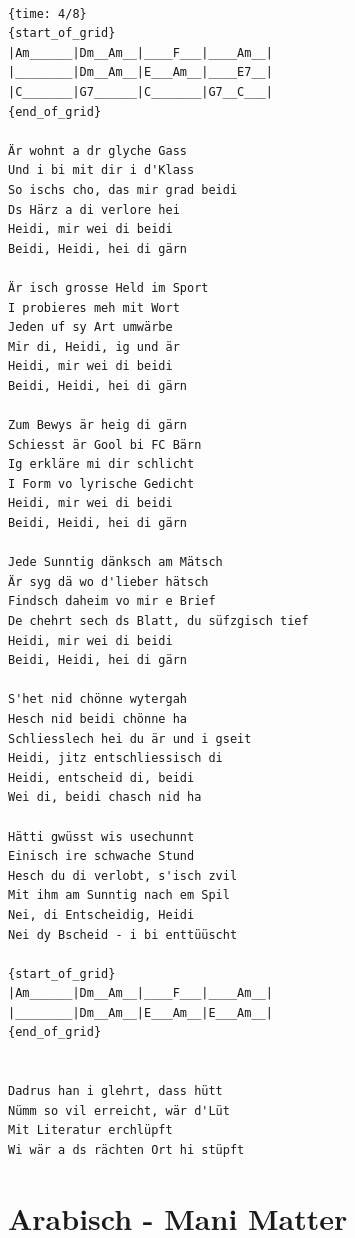 \documentclass[
]{book}
\let\stdsection\section
\renewcommand\section{\clearpage\stdsection}
\begin{document}
\begin{verbatim}

{time: 4/8}
{start_of_grid}
|Am______|Dm__Am__|____F___|____Am__|
|________|Dm__Am__|E___Am__|____E7__|
|C_______|G7______|C_______|G7__C___|
{end_of_grid}

Är wohnt a dr glyche Gass
Und i bi mit dir i d'Klass
So ischs cho, das mir grad beidi
Ds Härz a di verlore hei
Heidi, mir wei di beidi
Beidi, Heidi, hei di gärn

Är isch grosse Held im Sport
I probieres meh mit Wort
Jeden uf sy Art umwärbe
Mir di, Heidi, ig und är
Heidi, mir wei di beidi
Beidi, Heidi, hei di gärn

Zum Bewys är heig di gärn
Schiesst är Gool bi FC Bärn
Ig erkläre mi dir schlicht
I Form vo lyrische Gedicht
Heidi, mir wei di beidi
Beidi, Heidi, hei di gärn

Jede Sunntig dänksch am Mätsch
Är syg dä wo d'lieber hätsch
Findsch daheim vo mir e Brief
De chehrt sech ds Blatt, du süfzgisch tief
Heidi, mir wei di beidi
Beidi, Heidi, hei di gärn

S'het nid chönne wytergah
Hesch nid beidi chönne ha
Schliesslech hei du är und i gseit
Heidi, jitz entschliessisch di
Heidi, entscheid di, beidi
Wei di, beidi chasch nid ha

Hätti gwüsst wis usechunnt
Einisch ire schwache Stund
Hesch du di verlobt, s'isch zvil
Mit ihm am Sunntig nach em Spil
Nei, di Entscheidig, Heidi
Nei dy Bscheid - i bi enttüüscht

{start_of_grid}
|Am______|Dm__Am__|____F___|____Am__|
|________|Dm__Am__|E___Am__|E___Am__|
{end_of_grid}


Dadrus han i glehrt, dass hütt
Nümm so vil erreicht, wär d'Lüt
Mit Literatur erchlüpft
Wi wär a ds rächten Ort hi stüpft
\end{verbatim}

\hypertarget{arabisch---mani-matter}{%
\section{Arabisch - Mani Matter}\label{arabisch---mani-matter}}
\end{document}
